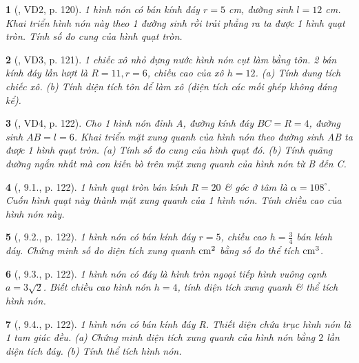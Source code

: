 \documentclass{article}
\newtheorem{baitoan}{}
\begin{document}
\begin{baitoan}[\cite{Binh_boi_duong_Toan_9_tap_2}, VD2, p. 120]
	1 hình nón có bán kính đáy $r = 5$ {\rm cm}, đường sinh $l = 12$ {\rm cm}. Khai triển hình nón này theo 1 đường sinh rồi trải phẳng ra ta được 1 hình quạt tròn. Tính số đo cung của hình quạt tròn.
\end{baitoan}

\begin{baitoan}[\cite{Binh_boi_duong_Toan_9_tap_2}, VD3, p. 121]
	1 chiếc xô nhỏ đựng nước hình nón cụt làm bằng tôn. 2 bán kính đáy lần lượt là $R = 11,r = 6$, chiều cao của xô $h = 12$. (a) Tính dung tích chiếc xô. (b) Tính diện tích tôn để làm xô (diện tích các mối ghép không đáng kể).
\end{baitoan}

\begin{baitoan}[\cite{Binh_boi_duong_Toan_9_tap_2}, VD4, p. 122]
	Cho 1 hình nón đỉnh A, đường kính đáy $BC = R = 4$, đường sinh $AB = l = 6$. Khai triển mặt xung quanh của hình nón theo đường sinh AB ta được 1 hình quạt tròn. (a) Tính số đo cung của hình quạt đó. (b) Tính quãng đường ngắn nhất mà con kiến bò trên mặt xung quanh của hình nón từ B đến C.
\end{baitoan}

\begin{baitoan}[\cite{Binh_boi_duong_Toan_9_tap_2}, 9.1., p. 122]
	1 hình quạt tròn bán kính $R = 20$ \& góc ở tâm là $\alpha = 108^\circ$. Cuốn hình quạt này thành mặt xung quanh của 1 hình nón. Tính chiều cao của hình nón này.
\end{baitoan}

\begin{baitoan}[\cite{Binh_boi_duong_Toan_9_tap_2}, 9.2., p. 122]
	1 hình nón có bán kính đáy $r = 5$, chiều cao $h = \frac{3}{4}$ bán kính đáy. Chứng minh số đo diện tích xung quanh $\rm cm^2$ bằng số đo thể tích $\rm cm^3$.
\end{baitoan}

\begin{baitoan}[\cite{Binh_boi_duong_Toan_9_tap_2}, 9.3., p. 122]
	1 hình nón có đáy là hình tròn ngoại tiếp hình vuông cạnh $a = 3\sqrt{2}$. Biết chiều cao hình nón $h = 4$, tính diện tích xung quanh \& thể tích hình nón.
\end{baitoan}

\begin{baitoan}[\cite{Binh_boi_duong_Toan_9_tap_2}, 9.4., p. 122]
	1 hình nón có bán kính đáy R. Thiết diện chứa trục hình nón là 1 tam giác đều. (a) Chứng minh diện tích xung quanh của hình nón bằng $2$ lần diện tích đáy. (b) Tính thể tích hình nón.
\end{baitoan}
\end{document}
